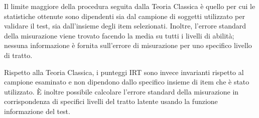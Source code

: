 Il limite maggiore della procedura seguita dalla Teoria Classica è quello per cui le statistiche ottenute sono dipendenti sia dal campione di soggetti utilizzato per validare il test, sia dall'insieme degli item selezionati. Inoltre, l'errore standard della misurazione viene trovato facendo la media su tutti i livelli di abilità; nessuna informazione è fornita sull'errore di misurazione per uno specifico livello di tratto. 

Rispetto alla Teoria Classica, i punteggi IRT sono invece invarianti rispetto al campione esaminato e non dipendono dallo specifico insieme di item che è stato utilizzato. {\`E} inoltre possibile calcolare l'errore standard della misurazione in corrispondenza di specifici livelli  del tratto latente usando la funzione informazione del test. 


